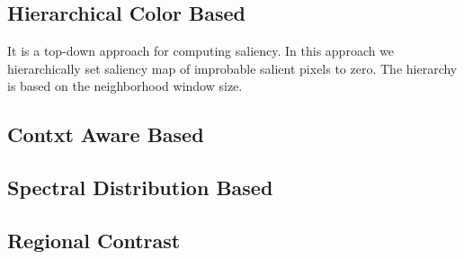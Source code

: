 \subsection{Hierarchical Color Based}
It is a top-down approach for computing saliency. In this approach we hierarchically set saliency map of improbable salient pixels to zero. The hierarchy is based on the neighborhood window size. 

\subsection{Contxt Aware Based}
\subsection{Spectral Distribution Based}
\subsection{Regional Contrast}



